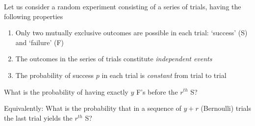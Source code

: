 \documentclass[smaller, handout]{beamer}\usepackage[]{graphicx}\usepackage[]{color}
\newenvironment{stepenumerate}{\begin{enumerate}[<+->]}{\end{enumerate}}
\begin{document}
\begin{frame}{\secname}%


Let us consider a random experiment consisting of a series of trials, having
the following properties \vspace{0.5cm}

\begin{stepenumerate}
\item Only two mutually exclusive outcomes are possible in each trial:
`success' (S) and `failure' (F)
\vspace{0.25cm}
\item The outcomes in the series of trials constitute \emph{independent
events}
\vspace{0.25cm}
\item The probability of success $p$ in each trial is \emph{constant }from
trial to trial
\end{stepenumerate}
\vspace{0.5cm}
What is the probability of having exactly $y$ F's before the $r^{th}$
S? \\ \vspace{0.25cm}

Equivalently: What is the probability that in a sequence of $y+r$ (Bernoulli) trials the last trial yields the
$r^{th}$ S?


\end{frame}%
\end{document}
